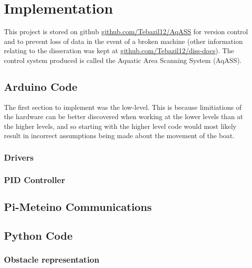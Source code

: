 \section{Implementation}
This project is stored on github \href{https://github.com/Tebazil12/AqASS}{github.com/Tebazil12/AqASS} for
version control and to prevent loss of data in the event of a broken machine (other information relating to the disseration was kept at \href{https://github.com/Tebazil12/diss-docs}{github.com/Tebazil12/diss-docs}).
The control system produced is called the Aquatic Area Scanning System (AqASS).

\subsection{Arduino Code}
The first section to implement was the low-level. This is because limitiations
of the hardware can be better discovered when working at the lower levels than
at the higher levels, and so starting with the higher level code would most
likely result in incorrect assumptions being made about the movement of the boat.

	\subsubsection{Drivers}

	\subsubsection{PID Controller}

\subsection{Pi-Meteino Communications}

\subsection{Python Code}

	\subsubsection{Obstacle representation}
	
	
